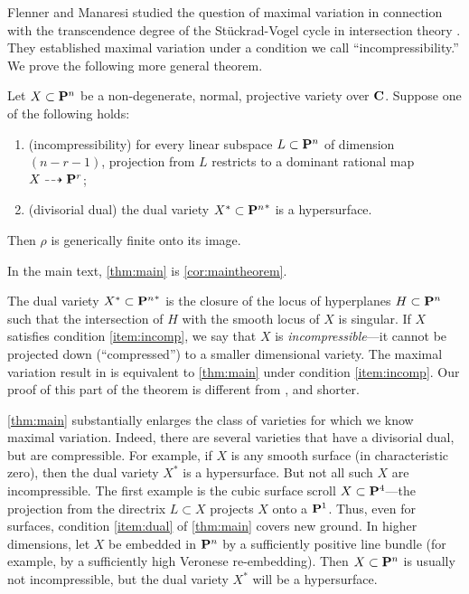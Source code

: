 \documentclass[11pt,reqno]{amsart}
\theoremstyle{plain}
\theoremstyle{definition}
\theoremstyle{remark}
\numberwithin{equation}{section}
\numberwithin{equation}{section}
\begin{document}
Flenner and Manaresi  studied the question of maximal variation
in connection with the transcendence degree of the St\"uckrad-Vogel cycle in intersection theory \cite{fle.man:98}. 
They established maximal variation under a condition we call ``incompressibility.''
We prove the following more general theorem.
\begin{maintheorem}\label{thm:main}
  Let $X \subset \P^n$ be a non-degenerate, normal, projective variety over $\C$.
  Suppose one of the following holds:
  \begin{enumerate}
  \item\label{item:incomp}(incompressibility) for every linear subspace $L \subset \P^n$ of dimension $(n-r-1)$, projection from $L$ restricts to a dominant rational map $X \dashrightarrow \P^r$;
  \item\label{item:dual}(divisorial dual) the dual variety $X^* \subset {\P^n}^*$ is a hypersurface.
  \end{enumerate}
  Then $\rho$ is generically finite onto its image.
\end{maintheorem}
In the main text, \autoref{thm:main} is \autoref{cor:maintheorem}.

The dual variety $X^* \subset {\P^n}^*$ is the closure of the locus of hyperplanes $H \subset \P^n$ such that the intersection of $H$ with the smooth locus of $X$ is singular.
If $X$ satisfies condition \eqref{item:incomp}, we say that $X$ is \emph{incompressible}---it cannot be projected down (``compressed'') to a smaller dimensional variety.
The maximal variation result in \cite{fle.man:98} is equivalent to \autoref{thm:main} under condition \eqref{item:incomp}.
Our proof of this part of the theorem is different from \cite{fle.man:98}, and shorter.


\autoref{thm:main} substantially enlarges the class of varieties for which we know maximal variation.
Indeed, there are several varieties that have a divisorial dual, but are compressible.
For example, if $X$ is any smooth surface (in characteristic zero), then the dual variety $X^*$ is a hypersurface.
But not all such $X$ are incompressible.
The first example is the cubic surface scroll $X \subset \P^4$---the projection from the directrix $L \subset X$ projects $X$ onto a $\P^1$.
Thus, even for surfaces, condition \eqref{item:dual} of \autoref{thm:main} covers new ground.
In higher dimensions, let $X$ be embedded in $\P^n$ by a sufficiently positive line bundle (for example, by a sufficiently high Veronese re-embedding).
Then $X \subset \P^n$ is usually not incompressible, but the dual variety $X^*$ will be a hypersurface.
\end{document}
